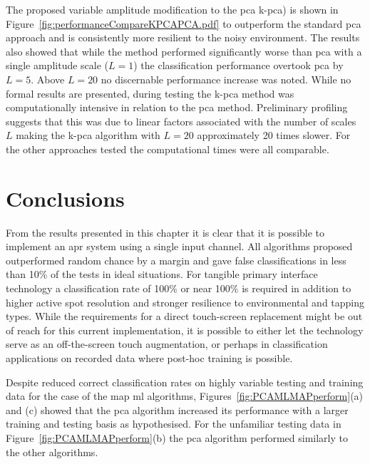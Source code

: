 The proposed variable amplitude modification to the \DIFdelbegin {}\DIFdelend \DIFaddbegin \gls{pca} \gls{k-pca}\DIFaddend ) is shown in Figure~\ref{fig:performanceCompareKPCAPCA.pdf} to outperform the standard \DIFdelbegin {}\DIFdelend \DIFaddbegin \gls{pca} \DIFaddend approach and is consistently more resilient to the noisy environment. The results also showed that while the method performed significantly worse than \DIFdelbegin {}\DIFdelend \DIFaddbegin \gls{pca} \DIFaddend with a single amplitude scale ($L=1$) the classification performance overtook \DIFdelbegin {}\DIFdelend \DIFaddbegin \gls{pca} \DIFaddend by $L=5$. Above $L=20$ no discernable performance increase was noted. While no formal results are presented, during testing the \DIFdelbegin {}\DIFdelend \DIFaddbegin \gls{k-pca} \DIFaddend method was computationally intensive in relation to the \DIFdelbegin {}\DIFdelend \DIFaddbegin \gls{pca} \DIFaddend method. Preliminary profiling suggests that this was due to linear factors associated with the number of scales $L$ making the \DIFdelbegin {}\DIFdelend \DIFaddbegin \gls{k-pca} \DIFaddend algorithm with $L=20$ approximately 20 times slower. For the other approaches tested the computational times were all comparable.

\section{Conclusions}
From the results presented in this chapter it is clear that it is possible to implement an \DIFdelbegin {}\DIFdelend \DIFaddbegin \gls{apr} \DIFaddend system using a single input channel. All algorithms proposed outperformed random chance by a margin and gave false classifications in less than 10\% of the tests in ideal situations. For tangible primary interface technology a classification rate of 100\% or near 100\% is required in addition to higher active spot resolution and stronger resilience to environmental and tapping types. While the requirements for a direct touch-screen replacement might be out of reach for this current implementation, it is possible to either let the technology serve as an off-the-screen touch augmentation, or perhaps in classification applications on recorded data where post-hoc training is possible.

Despite reduced correct classification rates on highly variable testing and training data for the case of the \DIFdelbegin {}\DIFdelend \DIFaddbegin \gls{map} \gls{ml} \DIFaddend algorithms, Figures~\ref{fig:PCAMLMAPperform}(a) and (c) showed that the \DIFdelbegin {}\DIFdelend \DIFaddbegin \gls{pca} \DIFaddend algorithm increased its performance with a larger training and testing basis as hypothesised. For the unfamiliar testing data in Figure~\ref{fig:PCAMLMAPperform}(b) the \DIFdelbegin {}\DIFdelend \DIFaddbegin \gls{pca} \DIFaddend algorithm performed similarly to the other algorithms.

